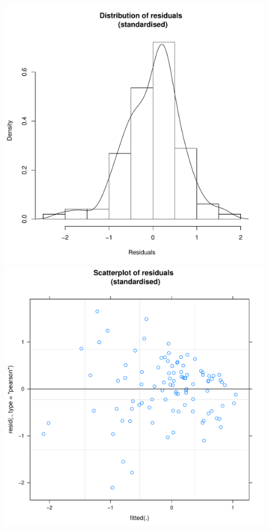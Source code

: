 \begin{CJK}{UTF8}{gbsn}
              \begin{figure}[htbp]
                \includegraphics[scale =.4]{images/MLM2aHist.pdf}
                \includegraphics[scale =.4]{images/MLM2aScatter.pdf}

\end{figure}
\end{CJK}
